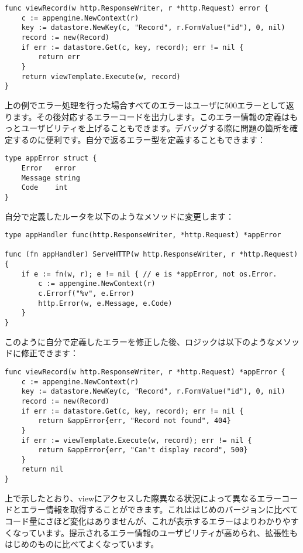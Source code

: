 \begin{lstlisting}[numbers=none]
func viewRecord(w http.ResponseWriter, r *http.Request) error {
    c := appengine.NewContext(r)
    key := datastore.NewKey(c, "Record", r.FormValue("id"), 0, nil)
    record := new(Record)
    if err := datastore.Get(c, key, record); err != nil {
        return err
    }
    return viewTemplate.Execute(w, record)
}
\end{lstlisting}

上の例でエラー処理を行った場合すべてのエラーはユーザに500エラーとして返ります。その後対応するエラーコードを出力します。このエラー情報の定義はもっとユーザビリティを上げることもできます。デバッグする際に問題の箇所を確定するのに便利です。自分で返るエラー型を定義することもできます：

\begin{lstlisting}[numbers=none]
type appError struct {
    Error   error
    Message string
    Code    int
}
\end{lstlisting}

自分で定義したルータを以下のようなメソッドに変更します：

\begin{lstlisting}[numbers=none]
type appHandler func(http.ResponseWriter, *http.Request) *appError

func (fn appHandler) ServeHTTP(w http.ResponseWriter, r *http.Request) {
    if e := fn(w, r); e != nil { // e is *appError, not os.Error.
        c := appengine.NewContext(r)
        c.Errorf("%v", e.Error)
        http.Error(w, e.Message, e.Code)
    }
}
\end{lstlisting}

このように自分で定義したエラーを修正した後、ロジックは以下のようなメソッドに修正できます：



\begin{lstlisting}[numbers=none]
func viewRecord(w http.ResponseWriter, r *http.Request) *appError {
    c := appengine.NewContext(r)
    key := datastore.NewKey(c, "Record", r.FormValue("id"), 0, nil)
    record := new(Record)
    if err := datastore.Get(c, key, record); err != nil {
        return &appError{err, "Record not found", 404}
    }
    if err := viewTemplate.Execute(w, record); err != nil {
        return &appError{err, "Can't display record", 500}
    }
    return nil
}
\end{lstlisting}

上で示したとおり、viewにアクセスした際異なる状況によって異なるエラーコードとエラー情報を取得することができます。これははじめのバージョンに比べてコード量にさほど変化はありませんが、これが表示するエラーはよりわかりやすくなっています。提示されるエラー情報のユーザビリティが高められ、拡張性もはじめのものに比べてよくなっています。



